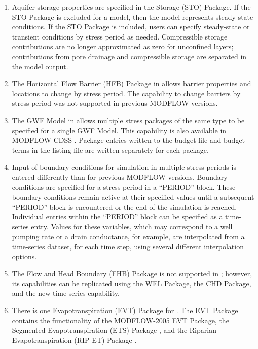 \begin{enumerate}
\item Aquifer storage properties are specified in the Storage (STO) Package.  If the STO Package is excluded for a model, then the model represents steady-state conditions.  If the STO Package is included, users can specify steady-state or transient conditions by stress period as needed.  Compressible storage contributions are no longer approximated as zero for unconfined layers; contributions from pore drainage and compressible storage are separated in the model output.

\item The Horizontal Flow Barrier (HFB) Package \citep{hsieh1993hfb, modflow2005} in \mf allows barrier properties and locations to change by stress period.  The capability to change barriers by stress period was not supported in previous MODFLOW versions.

\item The GWF Model in \mf allows multiple stress packages of the same type to be specified for a single GWF Model.  This capability is also available in MODFLOW-CDSS \citep{banta2011modflow}.  Package entries written to the budget file and budget terms in the listing file are written separately for each package.

\item Input of boundary conditions for simulation in multiple stress periods is entered differently than for previous MODFLOW versions. Boundary conditions are specified for a stress period in a ``PERIOD'' block. These boundary conditions remain active at their specified values until a subsequent ``PERIOD'' block is encountered or the end of the simulation is reached.  Individual entries within the ``PERIOD'' block can be specified as a time-series entry.  Values for these variables, which may correspond to a well pumping rate or a drain conductance, for example, are interpolated from a time-series dataset, for each time step, using several different interpolation options.

\item The Flow and Head Boundary (FHB) Package \citep{leake1997documentation, modflow2005} is not supported in \mf; however, its capabilities can be replicated using the WEL Package, the CHD Package, and the new time-series capability.

\item There is one Evapotranspiration (EVT) Package for \mf. The \mf EVT Package contains the functionality of the MODFLOW-2005 EVT Package, the Segmented Evapotranspiration (ETS) Package \citep{modflowdrtpack}, and the Riparian Evapotranspiration (RIP-ET) Package \citep{modflowripetpack}.


\end{enumerate}
